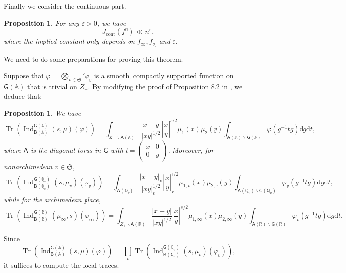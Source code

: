 \documentclass[10pt,oneside,reqno]{amsart}
\newcommand\rmd{\mathrm{d}}
\renewcommand\AA{\mathbb{A}}
\newcommand\QQ{\mathbb{Q}}
\newcommand\RR{\mathbb{R}}
\newcommand\mf[1]{\mathfrak{#1}}
\newcommand\A{\mathsf{A}}
\newcommand\B{\mathsf{B}}
\newcommand\G{\mathsf{G}}
\newcommand\bs{\backslash}
\DeclareMathOperator\Tr{Tr}
\DeclareMathOperator\Ind{Ind}
\theoremstyle{THEOREM}
\newtheorem{proposition}[theorem]{Proposition}
\theoremstyle{DEFINITION}
\theoremstyle{EXERCISE}
\numberwithin{equation}{section}
\begin{document}
Finally we consider the continuous part.
\begin{proposition}\label{prop:continuouspart}
For any $\varepsilon>0$, we have 
\[
J_{\mathrm{cont}}(f^n)\ll n^\varepsilon,
\]
where the implied constant only depends on $f_{\infty},f_{q_i}$ and $\varepsilon$.
\end{proposition}
We need to do some preparations for proving this theorem.

Suppose that $\varphi=\bigotimes_{v\in \mf{S}}'\varphi_v$ is a smooth, compactly supported function on $\G(\AA)$ that is trivial on $Z_+$. By modifying the proof of Proposition 8.2 in \cite{cheng2025}, we deduce that:

\begin{proposition}\label{prop:eisensteinfolding}
We have
\begin{equation}\label{eq:inducetraceglobal}
\Tr\left(\Ind_{\B(\AA)}^{\G(\AA)}(s,\mu)(\varphi)\right)=\int_{Z_+\bs \A(\AA)}\frac{|x-y|}{|xy|^{1/2}}\left|\frac xy\right|^{s/2}\mu_1(x)\mu_2(y)\int_{\A(\AA)\bs \G(\AA)}\varphi(g^{-1}tg)\rmd g \rmd t,
\end{equation}
where $\A$ is the diagonal torus in $\G$ with $t=(\begin{smallmatrix} x & 0 \\  0 & y \end{smallmatrix})$. Moreover, for nonarchimedean $v\in \mf{S}$,
\begin{equation}\label{eq:inducetracenonarchimedean}
\Tr\left(\Ind_{\B(\QQ_v)}^{\G(\QQ_v)}(s,\mu_v)(\varphi_v)\right)=\int_{ \A(\QQ_v)}\frac{|x-y|_v}{|xy|_v^{1/2}}\left|\frac xy\right|_v^{s/2}\mu_{1,v}(x)\mu_{2,v}(y)\int_{\A(\QQ_v)\bs \G(\QQ_v)}\varphi_v(g^{-1}tg)\rmd g \rmd t,
\end{equation}
while for the archimedean place,
\begin{equation}\label{eq:inducetracearchimedean}
\Tr\left(\Ind_{\B(\RR)}^{\G(\RR)}(\mu_\infty,s)(\varphi_\infty)\right)=\int_{ Z_+\bs\A(\RR)}\frac{|x-y|}{|xy|^{1/2}}\left|\frac xy\right|^{s/2}\mu_{1,\infty}(x)\mu_{2,\infty}(y)\int_{\A(\RR)\bs \G(\RR)}\varphi_v(g^{-1}tg)\rmd g \rmd t.
\end{equation}
\end{proposition}

Since
\[
\Tr\left(\Ind_{\B(\AA)}^{\G(\AA)}(s,\mu)(\varphi)\right) =\prod_{v}\Tr\left(\Ind_{\B(\QQ_v)}^{\G(\QQ_v)}(s,\mu_v)(\varphi_v)\right),
\]
it suffices to compute the local traces.
\end{document}
